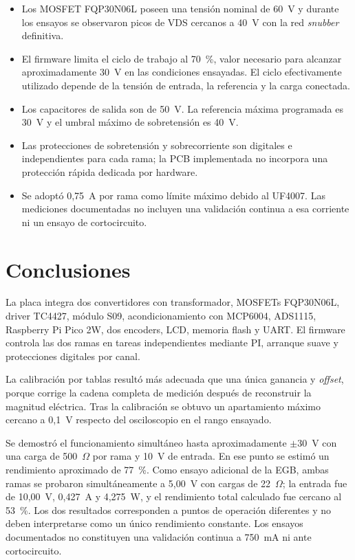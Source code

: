 \documentclass[conference]{IEEEtran}
\begin{document}
\begin{itemize}
\item Los MOSFET FQP30N06L poseen una tensión nominal de 60~V y durante los ensayos se observaron picos de VDS cercanos a 40~V con la red \textit{snubber} definitiva.
\item El firmware limita el ciclo de trabajo al 70~\%, valor necesario para alcanzar aproximadamente 30~V en las condiciones ensayadas. El ciclo efectivamente utilizado depende de la tensión de entrada, la referencia y la carga conectada.
\item Los capacitores de salida son de 50~V. La referencia máxima programada es 30~V y el umbral máximo de sobretensión es 40~V.
\item Las protecciones de sobretensión y sobrecorriente son digitales e independientes para cada rama; la PCB implementada no incorpora una protección rápida dedicada por hardware.
\item Se adoptó 0,75~A por rama como límite máximo debido al UF4007. Las mediciones documentadas no incluyen una validación continua a esa corriente ni un ensayo de cortocircuito.
\end{itemize}

\section{Conclusiones}

La placa integra dos convertidores con transformador, MOSFETs FQP30N06L, driver TC4427, módulo S09, acondicionamiento con MCP6004, ADS1115, Raspberry Pi Pico 2W, dos encoders, LCD, memoria flash y UART. El firmware controla las dos ramas en tareas independientes mediante PI, arranque suave y protecciones digitales por canal.

La calibración por tablas resultó más adecuada que una única ganancia y \textit{offset}, porque corrige la cadena completa de medición después de reconstruir la magnitud eléctrica. Tras la calibración se obtuvo un apartamiento máximo cercano a 0,1~V respecto del osciloscopio en el rango ensayado.

Se demostró el funcionamiento simultáneo hasta aproximadamente $\pm30$~V con una carga de 500~$\Omega$ por rama y 10~V de entrada. En ese punto se estimó un rendimiento aproximado de 77~\%. Como ensayo adicional de la EGB, ambas ramas se probaron simultáneamente a 5,00~V con cargas de 22~$\Omega$; la entrada fue de 10,00~V, 0,427~A y 4,275~W, y el rendimiento total calculado fue cercano al 53~\%. Los dos resultados corresponden a puntos de operación diferentes y no deben interpretarse como un único rendimiento constante. Los ensayos documentados no constituyen una validación continua a 750~mA ni ante cortocircuito.
\end{document}
